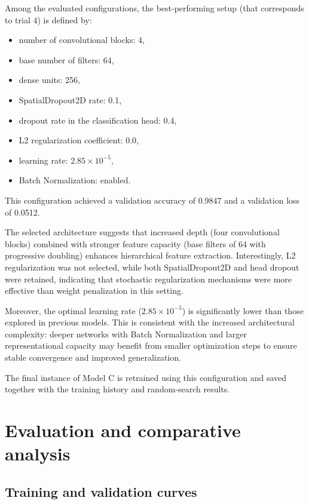 \documentclass[11pt,a4paper]{article}
\begin{document}
Among the evaluated configurations, the best-performing setup (that corresponds to trial 4) is defined by:

\begin{itemize}
    \item number of convolutional blocks: 4,
    \item base number of filters: 64,
    \item dense units: 256,
    \item SpatialDropout2D rate: 0.1,
    \item dropout rate in the classification head: 0.4,
    \item L2 regularization coefficient: 0.0,
    \item learning rate: $2.85 \times 10^{-5}$,
    \item Batch Normalization: enabled.
\end{itemize}

This configuration achieved a validation accuracy of 0.9847 and a validation loss of 0.0512.

The selected architecture suggests that increased depth (four convolutional blocks) combined with stronger feature capacity (base filters of 64 with progressive doubling) enhances hierarchical feature extraction.  
Interestingly, L2 regularization was not selected, while both SpatialDropout2D and head dropout were retained, indicating that stochastic regularization mechanisms were more effective than weight penalization in this setting.

Moreover, the optimal learning rate ($2.85 \times 10^{-5}$) is significantly lower than those explored in previous models.  
This is consistent with the increased architectural complexity: deeper networks with Batch Normalization and larger representational capacity may benefit from smaller optimization steps to ensure stable convergence and improved generalization.

The final instance of Model C is retrained using this configuration and saved together with the training history and random-search results.


\section{Evaluation and comparative analysis}
\subsection{Training and validation curves}
\end{document}
